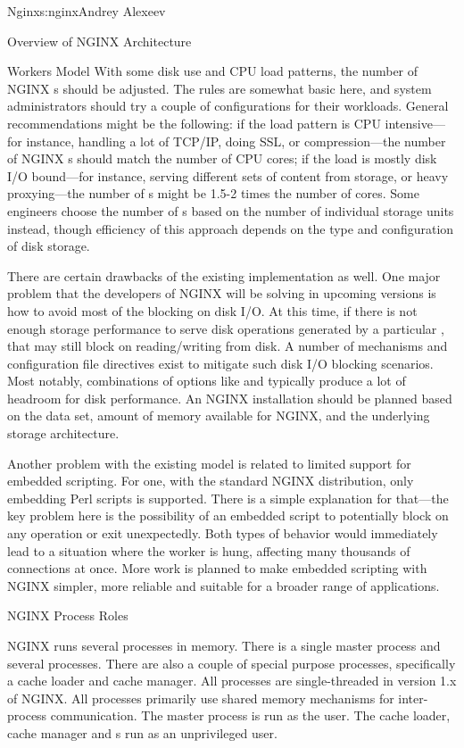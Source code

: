 \begin{aosachapter}{Nginx}{s:nginx}{Andrey Alexeev}
\begin{aosasect1}{Overview of NGINX Architecture}
\begin{aosasect2}{Workers Model}
With some disk use and CPU load patterns, the number of NGINX
s should be adjusted. The rules are somewhat basic here,
and system administrators should try a couple of configurations for
their workloads. General recommendations might be the following: if
the load pattern is CPU intensive---for instance, handling a lot of
TCP/IP, doing SSL, or compression---the number of NGINX s
should match the number of CPU cores; if the load is mostly disk I/O
bound---for instance, serving different sets of content from storage,
or heavy proxying---the number of s might be 1.5-2
times the number of cores. Some engineers choose the number of
s based on the number of individual storage units
instead, though efficiency of this approach depends on the type and
configuration of disk storage.

There are certain drawbacks of the existing implementation as
well. One major problem that the developers of NGINX will be solving
in upcoming versions is how to avoid most of the blocking on disk
I/O. At this time, if there is not enough storage performance to serve
disk operations generated by a particular , that
 may still block on reading/writing from disk. A number
of mechanisms and configuration file directives exist to mitigate such
disk I/O blocking scenarios. Most notably, combinations of options
like  and  typically produce a lot of
headroom for disk performance. An NGINX installation should be planned
based on the data set, amount of memory available for NGINX, and the
underlying storage architecture.

Another problem with the existing  model is related to
limited support for embedded scripting. For one, with the standard
NGINX distribution, only embedding Perl scripts is supported. There is
a simple explanation for that---the key problem here is the
possibility of an embedded script to potentially block on any
operation or exit unexpectedly. Both types of behavior would
immediately lead to a situation where the worker is hung, affecting
many thousands of connections at once. More work is planned to make
embedded scripting with NGINX simpler, more reliable and suitable for
a broader range of applications.

\end{aosasect2}

\begin{aosasect2}{NGINX Process Roles}

NGINX runs several processes in memory. There is a single master
process and several  processes. There are also a couple
of special purpose processes, specifically a cache loader and cache
manager. All processes are single-threaded in version 1.x of
NGINX. All processes primarily use shared memory mechanisms for
inter-process communication. The master process is run as the
 user. The cache loader, cache manager and s
run as an unprivileged user.


\end{aosasect2}
\end{aosasect1}
\end{aosachapter}
